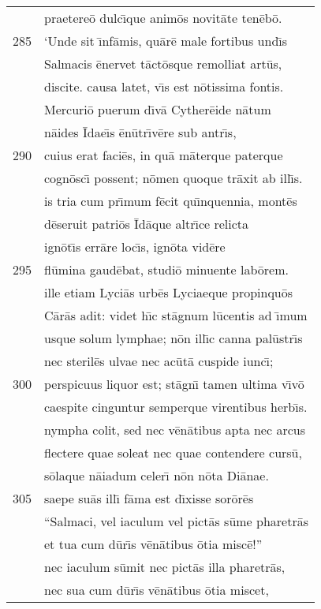 \documentclass[paper=6in:9in,pagesize=pdftex,
               headinclude=on,footinclude=on,12pt]{scrbook}
\begin{document}
\begin{longtable}[p]{ r l }
 & praetere\=o dulc\={\i}que anim\=os novit\=ate ten\=eb\=o.\\ 
285 & \indent `Unde sit \={\i}nf\=amis, qu\=ar\=e male fortibus und\={\i}s\\ 
 & Salmacis \=enervet t\=act\=osque remolliat art\=us,\\ 
 & discite. causa latet, v\={\i}s est n\=otissima fontis.\\ 
 & Mercuri\=o puerum d\={\i}v\=a Cyther\=eide n\=atum\\ 
 & n\=aides \=Idae\={\i}s \=en\=utr\={\i}v\=ere sub antr\={\i}s,\\ 
290 & cuius erat faci\=es, in qu\=a m\=aterque paterque\\ 
 & cogn\=osc\={\i} possent; n\=omen quoque tr\=axit ab ill\={\i}s.\\ 
 & is tria cum pr\={\i}mum f\=ecit qu\={\i}nquennia, mont\=es\\ 
 & d\=eseruit patri\=os \=Id\=aque altr\={\i}ce relicta\\ 
 & ign\=ot\={\i}s err\=are loc\={\i}s, ign\=ota vid\=ere\\ 
295 & fl\=umina gaud\=ebat, studi\=o minuente lab\=orem.\\ 
 & ille etiam Lyci\=as urb\=es Lyciaeque propinqu\=os\\ 
 & C\=ar\=as adit: videt h\={\i}c st\=agnum l\=ucentis ad \={\i}mum\\ 
 & usque solum lymphae; n\=on ill\={\i}c canna pal\=ustr\={\i}s\\ 
 & nec steril\=es ulvae nec ac\=ut\=a cuspide iunc\={\i};\\ 
300 & perspicuus liquor est; st\=agn\={\i} tamen ultima v\={\i}v\=o\\ 
 & caespite cinguntur semperque virentibus herb\={\i}s.\\ 
 & nympha colit, sed nec v\=en\=atibus apta nec arcus\\ 
 & flectere quae soleat nec quae contendere curs\=u,\\ 
 & s\=olaque n\=aiadum celer\={\i} n\=on n\=ota Di\=anae.\\ 
305 & saepe su\=as ill\={\i} f\=ama est d\={\i}xisse sor\=or\=es\\ 
 & ``Salmaci, vel iaculum vel pict\=as s\=ume pharetr\=as\\ 
 & et tua cum d\=ur\={\i}s v\=en\=atibus \=otia misc\=e!''\\ 
 & nec iaculum s\=umit nec pict\=as illa pharetr\=as,\\ 
 & nec sua cum d\=ur\={\i}s v\=en\=atibus \=otia miscet,\\ 

\end{longtable}
\end{document}
